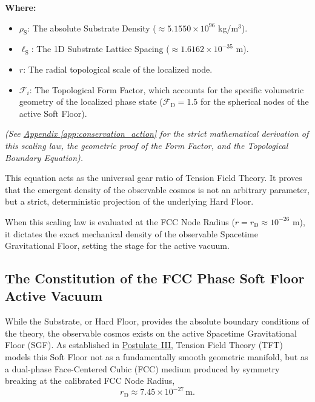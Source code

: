 \noindent\textbf{Where:}
\begin{itemize}
    \item $\rho_{\mathrm{S}}$: The absolute Substrate Density ($\approx 5.1550 \times 10^{96}$ kg/m$^3$).
    \item $\ell_{\mathrm{S}}$: The 1D Substrate Lattice Spacing ($\approx 1.6162 \times 10^{-35}$ m).
    \item $r$: The radial topological scale of the localized node.
    \item $\mathcal{F}_i$: The Topological Form Factor, which accounts for the specific volumetric geometry of the localized phase state ($\mathcal{F}_{\mathrm{D}} = 1.5$ for the spherical nodes of the active Soft Floor).
\end{itemize}

\textit{(See \hyperref[app:conservation_action]{Appendix \ref*{app:conservation_action}} for the strict mathematical derivation of this scaling law, the geometric proof of the Form Factor, and the Topological Boundary Equation).}

This equation acts as the universal gear ratio of Tension Field Theory. It proves that the emergent density of the observable cosmos is not an arbitrary parameter, but a strict, deterministic projection of the underlying Hard Floor.

When this scaling law is evaluated at the FCC Node Radius ($r = r_{\mathrm{D}} \approx 10^{-26}$ m), it dictates the exact mechanical density of the observable Spacetime Gravitational Floor, setting the stage for the active vacuum.

\subsection{The Constitution of the FCC Phase Soft Floor Active Vacuum}
\label{sec:fcc_lattice}

While the Substrate, or Hard Floor, provides the absolute boundary conditions of the theory, the observable cosmos exists on the active Spacetime Gravitational Floor (SGF). As established in \hyperref[postulate:three]{Postulate~III}, Tension Field Theory (TFT) models this Soft Floor not as a fundamentally smooth geometric manifold, but as a dual-phase Face-Centered Cubic (FCC) medium produced by symmetry breaking at the calibrated FCC Node Radius,
\begin{equation}
    r_{\mathrm{D}} \approx 7.45 \times 10^{-27}\,\mathrm{m}.
\end{equation}

